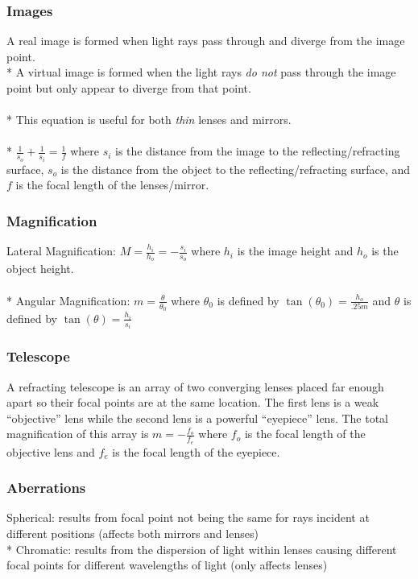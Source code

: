\subsubsection{Images}
A real image is formed when light rays pass through and diverge from the image point.\\*
A virtual image is formed when the light rays \emph{do not} pass through the image point but only appear to diverge from that point.\\\\*
This equation is useful for both \emph{thin} lenses and mirrors.\\\\*
\(\displaystyle \frac{1}{s_o}+\frac{1}{s_i}=\frac{1}{f}\) where  \(s_i\) is the distance from the image to the reflecting/refracting surface, \(s_o\) is the distance from the object to the reflecting/refracting surface, and \(f\) is the focal length of the lenses/mirror.

\subsubsection{Magnification}
Lateral Magnification: \(\displaystyle M=\frac{h_{i}}{h_{o}}=-\frac{s_{i}}{s_{o}}\) where \(h_i\) is the image height and \(h_o\) is the object height.\\\\*
Angular Magnification: \(\displaystyle m=\frac{\theta}{\theta_0}\) where \(\theta_0\) is defined by \(\displaystyle\tan(\theta_0)=\frac{h_o}{.25m}\) and \(\theta\) is defined by \(\displaystyle\tan(\theta)=\frac{h_i}{s_i}\)

\subsubsection{Telescope}
A refracting telescope is an array of two converging lenses placed far enough apart so their focal points are at the same location.
The first lens is a weak ``objective'' lens while the second lens is a powerful ``eyepiece'' lens.
The total magnification of this array is \(\displaystyle m=-\frac{f_o}{f_e}\) where \(f_o\) is the focal length of the objective lens and \(f_e\) is the focal length of the eyepiece.

\subsubsection{Aberrations}
Spherical: results from focal point not being the same for rays incident at different positions (affects both mirrors and lenses)\\*
Chromatic: results from the dispersion of light within lenses causing different focal points for different wavelengths of light (only affects lenses)

